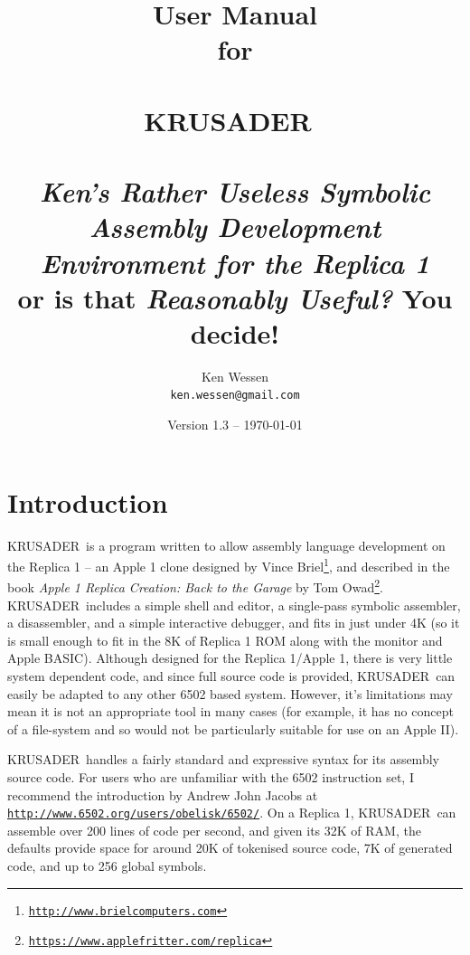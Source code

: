 \documentclass[12pt]{article}
\newcommand{\krusader}{\textsf{KRUSADER}}
\renewcommand{\url}[1]{\href{#1}{\texttt{#1}}}
\begin{document}
\title{User Manual \\ for \\ {~} \\ \Huge \krusader\ \normalsize \\ {~} \\
\textit{Ken's Rather Useless Symbolic Assembly Development Environment for the Replica 1}\\
or is that \textit{Reasonably Useful?}  You decide!}

\author{Ken Wessen \\ \texttt{ken.wessen@gmail.com} }
\date{Version 1.3 -- \today}
\maketitle

\section{Introduction}

\krusader\ is a program written to allow assembly language development on the Replica 1 -- an Apple 1 clone designed by Vince Briel\footnote{\url{http://www.brielcomputers.com}}, and described in the book \textit{Apple 1 Replica Creation: Back to the Garage} by Tom Owad\footnote{\url{https://www.applefritter.com/replica}}.
\krusader\ includes a simple shell and editor, a single-pass symbolic assembler, a disassembler, and a simple interactive debugger, and fits in just under 4K (so it is
small enough to fit in the 8K of Replica 1 ROM along with the monitor and Apple BASIC).
Although designed for the Replica 1/Apple 1, there is very little system dependent code, and since full source code is provided, \krusader\ can easily be adapted to any other 6502 based system.  However, it's limitations may mean it is not an appropriate tool in many cases (for example, it has no concept of a file-system and so would not be particularly suitable for use on an Apple II).

\krusader\ handles a fairly standard and expressive syntax for its assembly source code.
For users who are unfamiliar with the 6502 instruction set, I recommend the introduction by Andrew John Jacobs at \url{http://www.6502.org/users/obelisk/6502/}.
On a Replica 1, \krusader\ can assemble over 200 lines of code per second, and given its 32K of RAM, the defaults provide space for around 20K of tokenised source code, 7K of generated code, and up to 256 global symbols.
\end{document}
